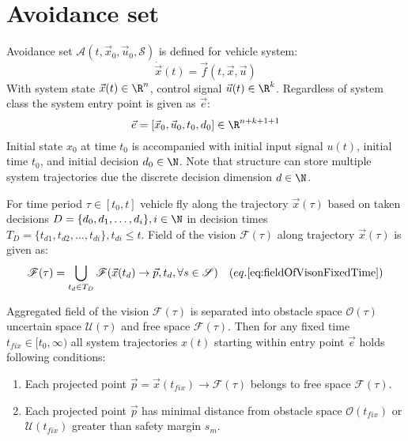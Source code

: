 \section{Avoidance set}\label{s:AvoidanceSet}
    \begin{definition}{Avoidance set $\mathscr{A}(t,\vec{x}_0,\vec{u}_0,\mathscr{S})$} is defined for vehicle system:
    \begin{equation}
        \dot{\vec{x}}(t)=\vec{f}(t,\vec{x},\vec{u})
    \end{equation}
    With system state $\vec{x}(t)\in\R^n$, control signal $\vec{u}(t)\in\R^k$. Regardless of system class the system entry point is given as $\vec{e}$:
    \begin{equation}
        \vec{e}= [\vec{x}_0,\vec{u}_0,t_0,d_0]\in\R^{n+k+1+1}
    \end{equation}
    Initial state $x_0$ at time $t_0$ is accompanied with initial input signal $u(t)$, initial time $t_0$, and initial decision $d_0\in\N$. Note that structure can store multiple system trajectories due the discrete decision dimension $d\in\N$.
    
    For time period $\tau\in[t_0,t]$ vehicle fly along the trajectory $\vec{x}(\tau)$ based on taken decisions $D=\{d_0,d_1,\dots,d_i\},i\in\N$ in decision times $T_D=\{t_{d1},t_{d2},\dots,t_{di}\}, t_{di}\le t$. Field of the vision $\mathscr{F}(\tau)$ along trajectory $\vec{x}(\tau)$ is given as:
    \begin{equation}
        \mathscr{F}(\tau) = \bigcup_{t_d\in T_D} \mathscr{F}(\vec{x}(t_d)\to\vec{p},t_d,\forall s\in\mathscr{S}) \quad (eq. \ref{eq:fieldOfVisonFixedTime})
    \end{equation}
    \end{definition}
    Aggregated field of the vision $\mathscr{F}(\tau)$ is separated into obstacle space $\mathscr{O}(\tau)$ uncertain space $\mathscr{U}(\tau)$ and free space $\mathscr{F}(\tau)$. Then for any fixed time $t_{fix}\in[t_0,\infty)$ all system trajectories $x(t)$ starting within entry point $\vec{e}$ holds following conditions:
    \begin{enumerate}
        \item Each projected point $\vec{p}=\vec{x}(t_{fix})\to\mathscr{F}(\tau)$ belongs to free space $\mathscr{F}(\tau)$.
        \item Each projected point $\vec{p}$ has minimal distance from obstacle space $\mathscr{O}(t_{fix})$ or $\mathscr{U}(t_{fix})$ greater than safety margin $s_m$.
    \end{enumerate}
    

